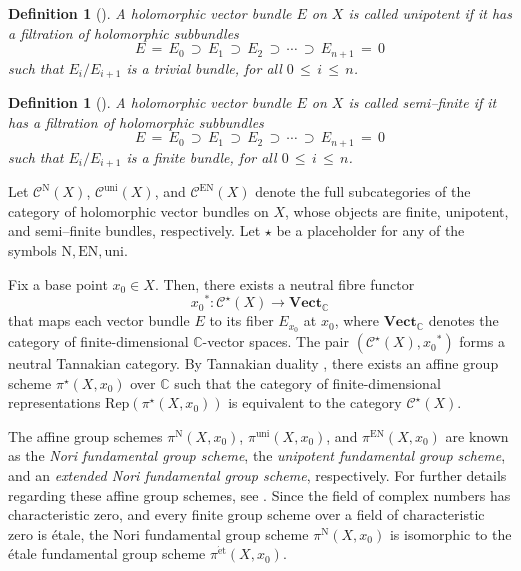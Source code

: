 \documentclass[12pt, reqno]{amsart}
\theoremstyle{plain}
\newtheorem{definition}[theorem]{Definition}
\numberwithin{equation}{section}
\begin{document}
\begin{definition}[{\cite{No}}]\label{def-unipotent}\rm{
A holomorphic vector bundle $E$ on $X$ is called \textit{unipotent} if it has a filtration of holomorphic subbundles 
$$
E\,=\,E_0\,\supset\, E_1 \,\supset\, E_2 \,\supset\,\cdots\, \supset\, E_{n+1}\,=\,0
$$ such that $E_i/E_{i+1}$ is a trivial bundle, for all $0\, \leq\, i\, \leq\, n$.
}
\end{definition}

\begin{definition}[{\cite{Ot}}]\label{def-semifinite}\rm{
A holomorphic vector bundle $E$ on $X$ is called \textit{semi--finite} if it has a filtration of holomorphic subbundles 
$$
E\,=\,E_0\,\supset\, E_1 \,\supset\, E_2 \,\supset\,\cdots\, \supset\, E_{n+1}\,=\,0
$$ such that $E_i/E_{i+1}$ is a finite bundle, for all $0\, \leq\, i\, \leq\, n$.
}
\end{definition} 


Let \(\mathcal{C}^{\mathrm{N}}(X)\), \(\mathcal{C}^{\mathrm{uni}}(X)\), and \(\mathcal{C}^{\mathrm{EN}}(X)\) denote the full subcategories of the category of holomorphic vector bundles on \(X\), whose objects are finite, unipotent, and semi--finite bundles, respectively. Let \(\star\) be a placeholder for any of the symbols \(\mathrm{N}, \mathrm{EN}, \mathrm{uni}\).  

Fix a base point \(x_0 \in X\). Then, there exists a neutral fibre functor  
\[
{x_0}^* \colon \mathcal{C}^{\star}(X) \longrightarrow \mathbf{Vect}_{\mathbb{C}}
\]
that maps each vector bundle \(E\) to its fiber \(E_{x_0}\) at \(x_0\), where $\mathbf{Vect}_{\mathbb{C}}$ denotes the category of finite-dimensional $\mathbb{C}$-vector spaces. The pair \((\mathcal{C}^{\star}(X), {x_0}^*)\) forms a neutral Tannakian category. By Tannakian duality \cite[Theorem 1.12]{PD}, there exists an affine group scheme \(\pi^{\star}(X, x_0)\) over \(\mathbb{C}\) such that the category of finite-dimensional representations \(\mathrm{Rep}(\pi^{\star}(X, x_0))\) is equivalent to the category \(\mathcal{C}^{\star}(X)\).  

The affine group schemes \(\pi^{\mathrm{N}}(X, x_0)\), \(\pi^{\mathrm{uni}}(X, x_0)\), and \(\pi^{\mathrm{EN}}(X, x_0)\) are known as the \emph{Nori fundamental group scheme}, the \emph{unipotent fundamental group scheme}, and an \emph{extended Nori fundamental group scheme}, respectively. For further details regarding these affine group schemes, see \cite{No, Ot, AA}. Since the field of complex numbers has characteristic zero, and every finite group scheme over a field of characteristic zero is \'etale, the Nori fundamental group scheme \(\pi^{\mathrm{N}}(X, x_0)\) is isomorphic to the \'etale fundamental group scheme \(\pi^{\mathrm{\acute{e}t}}(X, x_0)\).
\end{document}
